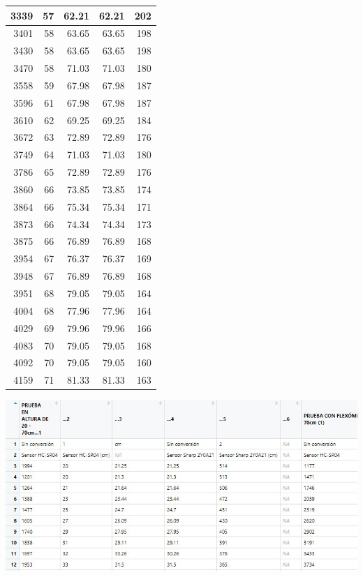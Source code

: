 \documentclass[
]{article}
\begin{document}
\begin{table}
\begin{tabular}{r|r|r|r|r}
\hline
3339 & 57 & 62.21 & 62.21 & 202\\
\hline
3401 & 58 & 63.65 & 63.65 & 198\\
\hline
3430 & 58 & 63.65 & 63.65 & 198\\
\hline
3470 & 58 & 71.03 & 71.03 & 180\\
\hline
3558 & 59 & 67.98 & 67.98 & 187\\
\hline
3596 & 61 & 67.98 & 67.98 & 187\\
\hline
3610 & 62 & 69.25 & 69.25 & 184\\
\hline
3672 & 63 & 72.89 & 72.89 & 176\\
\hline
3749 & 64 & 71.03 & 71.03 & 180\\
\hline
3786 & 65 & 72.89 & 72.89 & 176\\
\hline
3860 & 66 & 73.85 & 73.85 & 174\\
\hline
3864 & 66 & 75.34 & 75.34 & 171\\
\hline
3873 & 66 & 74.34 & 74.34 & 173\\
\hline
3875 & 66 & 76.89 & 76.89 & 168\\
\hline
3954 & 67 & 76.37 & 76.37 & 169\\
\hline
3948 & 67 & 76.89 & 76.89 & 168\\
\hline
3951 & 68 & 79.05 & 79.05 & 164\\
\hline
4004 & 68 & 77.96 & 77.96 & 164\\
\hline
4029 & 69 & 79.96 & 79.96 & 166\\
\hline
4083 & 70 & 79.05 & 79.05 & 168\\
\hline
4092 & 70 & 79.05 & 79.05 & 160\\
\hline
4159 & 71 & 81.33 & 81.33 & 163\\
\hline
\end{tabular}
\end{table}

\includegraphics{images/adq1.PNG}
\end{document}
